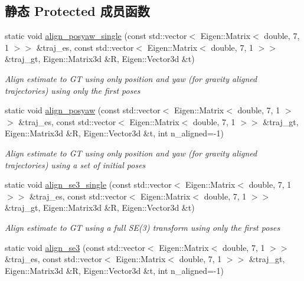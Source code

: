 \subsection*{静态 Protected 成员函数}
\begin{DoxyCompactItemize}
\item 
static void \hyperlink{classov__eval_1_1AlignTrajectory_ab281d908409f24b08c3ac910b4d942f0}{align\+\_\+posyaw\+\_\+single} (const std\+::vector$<$ Eigen\+::\+Matrix$<$ double, 7, 1 $>$$>$ \&traj\+\_\+es, const std\+::vector$<$ Eigen\+::\+Matrix$<$ double, 7, 1 $>$$>$ \&traj\+\_\+gt, Eigen\+::\+Matrix3d \&R, Eigen\+::\+Vector3d \&t)
\begin{DoxyCompactList}\small\item\em Align estimate to GT using only position and yaw (for gravity aligned trajectories) using only the first poses \end{DoxyCompactList}\item 
static void \hyperlink{classov__eval_1_1AlignTrajectory_aea1c35dee4b15301c7248c1698ee4ffa}{align\+\_\+posyaw} (const std\+::vector$<$ Eigen\+::\+Matrix$<$ double, 7, 1 $>$$>$ \&traj\+\_\+es, const std\+::vector$<$ Eigen\+::\+Matrix$<$ double, 7, 1 $>$$>$ \&traj\+\_\+gt, Eigen\+::\+Matrix3d \&R, Eigen\+::\+Vector3d \&t, int n\+\_\+aligned=-\/1)
\begin{DoxyCompactList}\small\item\em Align estimate to GT using only position and yaw (for gravity aligned trajectories) using a set of initial poses \end{DoxyCompactList}\item 
static void \hyperlink{classov__eval_1_1AlignTrajectory_a23c39c91e3ba64678efe9734086babec}{align\+\_\+se3\+\_\+single} (const std\+::vector$<$ Eigen\+::\+Matrix$<$ double, 7, 1 $>$$>$ \&traj\+\_\+es, const std\+::vector$<$ Eigen\+::\+Matrix$<$ double, 7, 1 $>$$>$ \&traj\+\_\+gt, Eigen\+::\+Matrix3d \&R, Eigen\+::\+Vector3d \&t)
\begin{DoxyCompactList}\small\item\em Align estimate to GT using a full S\+E(3) transform using only the first poses \end{DoxyCompactList}\item 
static void \hyperlink{classov__eval_1_1AlignTrajectory_af48d64a8e529e8ec2471ff42b439e54a}{align\+\_\+se3} (const std\+::vector$<$ Eigen\+::\+Matrix$<$ double, 7, 1 $>$$>$ \&traj\+\_\+es, const std\+::vector$<$ Eigen\+::\+Matrix$<$ double, 7, 1 $>$$>$ \&traj\+\_\+gt, Eigen\+::\+Matrix3d \&R, Eigen\+::\+Vector3d \&t, int n\+\_\+aligned=-\/1)

\end{DoxyCompactItemize}
